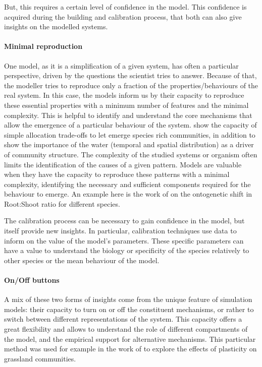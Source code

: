 But, this requires a certain level of confidence in the model. This confidence is acquired during the building and calibration process, that both can also give insights on the modelled systems.

\paragraph{Minimal reproduction}

One model, as it is a simplification of a given system, has often a particular perspective, driven by the questions the scientist tries to answer. Because of that, the modeller tries to reproduce only a fraction of the properties/behaviours of the real system. In this case, the models inform us by their capacity to reproduce these essential properties with a minimum number of features and the minimal complexity. This is helpful to identify and understand the core mechanisms that allow the emergence of a particular behaviour of the system. \citet{reineking_environmental_2006} show the capacity of simple allocation trade-offs to let emerge species rich communities, in addition to show the importance of the water (temporal and spatial distribution) as a driver of community structure. The complexity of the studied systems or organism often limits the identification of the causes of a given pattern. Models are valuable when they have the capacity to reproduce these patterns with a minimal complexity, identifying the necessary and sufficient components required for the behaviour to emerge. An example here is the work of \citet{lohier_explaining_2014} on the ontogenetic shift in Root:Shoot ratio for different species.

The calibration process can be necessary to gain confidence in the model, but itself provide new insights. In particular, calibration techniques use data to inform on the value of the model's parameters. These specific parameters can have a value to understand the biology or specificity of the species relatively to other species or the mean behaviour of the model.

\paragraph{On/Off buttons}

A mix of these two forms of insights come from the unique feature of simulation models: their capacity to turn on or off the constituent mechanisms, or rather to switch between different representations of the system. This capacity offers a great flexibility and allows to understand the role of different compartments of the model, and the empirical support for alternative mechanisms. This particular method was used for example in the work of \citet{maire_plasticity_2013} to explore the effects of plasticity on grassland communities.\\

